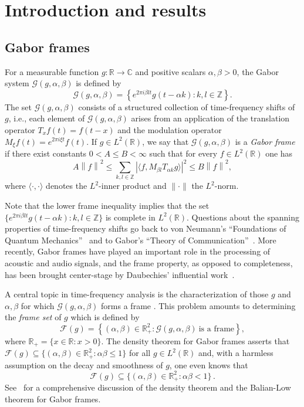 \documentclass[reqno,a4paper,12pt]{amsart}
\numberwithin{equation}{section}
\def\Z{{\mathbb Z}}
\def\R{{\mathbb R}}
\def\C{{\mathbb C}}
\newcommand{\lt}{{L^2(\R)}}
\newcommand\1{\mathds{1}}
\newcommand{\ft}{{\mathcal{F}}}
\newcommand{\norm}[1]{\left\lVert #1 \right\rVert}
\newcommand{\abs}[1]{\left\lvert #1 \right\rvert}
\newcommand{\cG}{\mathcal{G}}
\begin{document}
\section{Introduction and results}

\subsection{Gabor frames}
For a measurable function $g: \R \to \C$ and positive scalars
$\alpha,\beta>0$, the Gabor system $\cG(g,\alpha,\beta)$ is defined by
\begin{equation}\label{eq:def:cG}
    \cG(g,\alpha,\beta)=\left \{ e^{2\pi i \beta lt }g(t-\alpha k) :k,l\in \Z \right \}.
\end{equation}
The set  $\cG(g,\alpha,\beta)$ consists of a structured collection of time-frequency shifts of $g$, i.e., each element of $\cG(g,\alpha,\beta)$ arises from an application of the translation operator $T_x f(t) = f(t-x)$ and the modulation operator $M_\xi f(t) = e^{2\pi i \xi t} f(t)$.
If $g\in L^2(\R)$, we say that $\cG(g,\alpha,\beta)$ is a \emph{Gabor
frame} if there exist constants $0<A\leq B<\infty$ such that for every $f \in \lt$ one has
$$
A\norm{f}^2
\leq
\sum_{k,l\in \Z}\abs{\langle f,M_{\beta l}T_{\alpha k}g\rangle}^2 \leq
B\norm{f}^2,
$$
where $\langle \cdot ,\cdot \rangle$ denotes the $L^2$-inner product
and $\| \cdot  \|$ the $L^2$-norm.

Note that the lower frame inequality implies  that the
set $\{ e^{2\pi i \beta lt }g(t-\alpha k) :k,l\in \Z  \}$ is
complete in $L^2(\R )$. Questions about the spanning properties of
time-frequency shifts go back to von Neumann's ``Foundations of
Quantum Mechanics''~\cite{neumann} and to  Gabor's ``Theory of
Communication''~\cite{gabor}. More recently, Gabor frames have played an
important role in the processing of acoustic and audio signals, and
the frame property, as opposed to completeness, has been brought
center-stage by Daubechies' influential
work~\cite{daubechies2002wavelet}. 


A central topic in time-frequency analysis is the characterization of
those $g$ and $\alpha,\beta$ for which $\cG(g,\alpha,\beta)$ forms a
frame \cite{Groechenig2001,heil2007history,mystery}. This problem amounts to determining the \emph{frame set} of $g$ which is defined by
$$
\ft(g) = \left \{ (\alpha,\beta) \in \R_+^2 : \cG(g,\alpha,\beta) \ \text{is a frame} \right \} ,
$$
where $\R_+ = \{ x \in \R : x > 0 \}$. The density theorem for Gabor
frames asserts that $\ft (g) \subseteq \{ (\alpha,\beta) \in \R_{+}^2
: \alpha\beta \leq  1 \}$ for all $g\in L^2(\R )$ and, with a harmless
assumption on the decay and smoothness of $g$, one even knows that
\begin{equation}  \label{eq:c5}
\ft (g) \subseteq \{ (\alpha,\beta) \in \R_{+}^2 : \alpha\beta < 1
\}\, .  
\end{equation}
See~\cite{heil2007history} for a comprehensive discussion of the
density theorem and the Balian-Low theorem for Gabor frames. 
\end{document}
